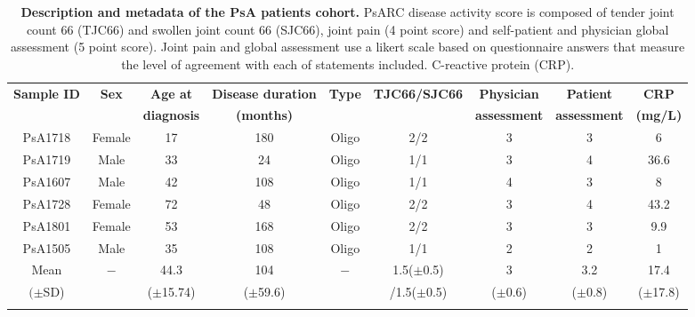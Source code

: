 %
\begin{landscape}
\begin{center}
\renewcommand{\arraystretch}{0.8}
\begin{longtable}[ht]{c c c c c c c c c}
\caption[Description and metadata of the PsA patients cohort.]{\textbf{Description and metadata of the PsA patients cohort.} PsARC disease activity score is composed of tender joint count 66 (TJC66) and swollen joint count 66 (SJC66), joint pain (4 point score) and self-patient and physician global assessment (5 point score). Joint pain and global assessment use a likert scale based on questionnaire answers that measure the level of agreement with each of statements included. C-reactive protein (CRP).}
\label{tab:PSA_cohort_metadata} \\
\toprule
\textbf{ Sample ID} & \textbf{Sex} & \textbf{Age at} & \textbf{Disease duration} & \textbf{Type} &\textbf{TJC66/SJC66}  & \textbf{Physician } & \textbf{Patient} & \textbf{CRP} \\
                   &               & \textbf{diagnosis} & \textbf{(months)}      &               &                      & \textbf{assessment} & \textbf{assessment}  & \textbf{(mg/L)} \\
\midrule
\midrule
PsA1718 & Female & 17 & 180 & Oligo  & 2/2 & 3 & 3 & 6 \\
PsA1719	& Male &	33 & 24	 & Oligo &	1/1 &	3 & 4 & 36.6 \\           
PsA1607 &	Male & 42 & 108 &	Oligo &	1/1	& 4 & 3 & 8 \\
PsA1728	& Female & 72	& 48 & Oligo & 2/2 & 3 & 4 & 43.2 \\
PsA1801	& Female & 53 & 168 & Oligo & 2/2 &	3 & 3 & 9.9 \\
PsA1505 & Male & 35 &	108 & Oligo & 1/1 & 2 & 2 & 1 \\	
\midrule
Mean		  & $-$	&	44.3         & 104         & $-$ & 1.5($\pm$0.5)  & 3         & 3.2        & 17.4       \\	
$(\pm$SD)	&   	&	($\pm$15.74) & ($\pm$59.6) &     & /1.5($\pm$0.5) &($\pm$0.6) & ($\pm$0.8) & ($\pm$17.8) \\																			
\bottomrule
\medskip
\end{longtable}
\end{center}
\end{landscape}


